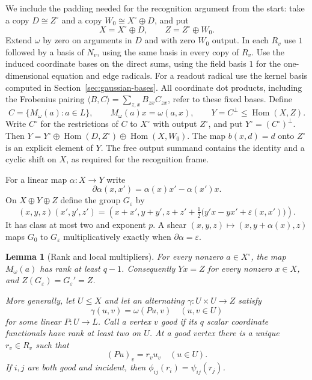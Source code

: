 \documentclass[11pt]{article}
\DeclareMathOperator{\Hom}{Hom}
\newtheorem{lemma}[theorem]{Lemma}
\theoremstyle{definition}
\theoremstyle{remark}
\numberwithin{equation}{section}
\begin{document}
We include the padding needed for the recognition argument from the start:
take a copy $D\cong Z^\circ$ and a copy $W_0\cong X^\circ\oplus D$, and put
\[
 X=X^\circ\oplus D,\qquad Z=Z^\circ\oplus W_0.
\]
Extend $\omega$ by zero on arguments in $D$ and with zero $W_0$ output.
In each $R_v$ use $1$ followed by a basis of $N_v$, using the same
basis in every copy of $R_v$. Use the induced coordinate bases on
the direct sums, using the field basis $1$ for the one-dimensional
equation and edge radicals.
For a readout radical use the kernel basis computed in
Section~\ref{sec:gaussian-bases}. All coordinate dot products, including
the Frobenius pairing $\langle B,C\rangle=\sum_{z,x} B_{zx}C_{zx}$,
refer to these fixed bases.  Define
\begin{equation}
 C=\{M_\omega(a):a\in L\},\qquad M_\omega(a)x=\omega(a,x),
 \qquad Y=C^\perp\le\Hom(X,Z).
 \label{hyb:C}
\end{equation}
Write $C^\circ$ for the restrictions of $C$ to $X^\circ$ with output
$Z^\circ$, and put $Y^\circ=(C^\circ)^\perp$.  Then
$Y=Y^\circ\oplus\Hom(D,Z^\circ)\oplus\Hom(X,W_0)$.
The map $b(x,d)=d$ onto $Z^\circ$ is an explicit
element of $Y$.  The free output summand contains the identity and a
cyclic shift on $X$, as required for the recognition frame.

For a linear map $\alpha:X\to Y$ write
\[
 \partial\alpha(x,x')=\alpha(x)x'-\alpha(x')x.
\]
On $X\oplus Y\oplus Z$ define the group $G_\varepsilon$ by
\begin{equation}
 (x,y,z)(x',y',z')=
 \left(x+x',y+y',z+z'+\tfrac12
       \bigl(y'x-yx'+\varepsilon(x,x')\bigr)\right).
 \label{hyb:group}
\end{equation}
It has class at most two and exponent $p$.  A shear
$(x,y,z)\mapsto(x,y+\alpha(x),z)$ maps $G_0$ to $G_\varepsilon$
multiplicatively exactly when $\partial\alpha=\varepsilon$.

\begin{lemma}[Rank and local multipliers]
\label{hyb:local}
For every nonzero $a\in X^\circ$, the map $M_\omega(a)$ has rank at least $q-1$.
Consequently $Yx=Z$ for every nonzero $x\in X$, and
$Z(G_\varepsilon)=G_\varepsilon'=Z$.

More generally, let $U\le X$ and let an alternating $\gamma:U\times U\to Z$
satisfy
\begin{equation}
 \gamma(u,v)=\omega(Pu,v)\quad(u,v\in U)
 \label{hyb:partial-symbol}
\end{equation}
for some linear $P:U\to L$.  Call a vertex $v$ good if its $q$ scalar
coordinate functionals have rank at least two on $U$.  At a good vertex
there is a unique $r_v\in R_v$ such that
\[
 (Pu)_v=r_vu_v\quad(u\in U).
\]
If $i,j$ are both good and incident, then
$\phi_{ij}(r_i)=\psi_{ij}(r_j)$.
\end{lemma}
\end{document}
